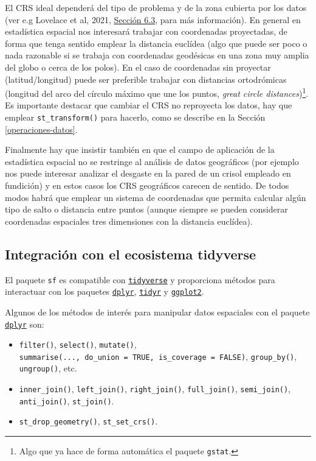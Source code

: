 \documentclass[
  spanish,
]{book}
\providecommand{\tightlist}{%
  \setlength{\itemsep}{0pt}\setlength{\parskip}{0pt}}
\theoremstyle{break}
\theoremstyle{definition}
\theoremstyle{definition}
\theoremstyle{definition}
\theoremstyle{definition}
\theoremstyle{remark}
\begin{document}
El CRS ideal dependerá del tipo de problema y de la zona cubierta por los datos (ver e.g Lovelace et al, 2021, \href{https://geocompr.robinlovelace.net/reproj-geo-data.html\#which-crs-to-use}{Sección 6.3}, para más información).
En general en estadística espacial nos interesará trabajar con coordenadas proyectadas, de forma que tenga sentido emplear la distancia euclídea (algo que puede ser poco o nada razonable si se trabaja con coordenadas geodésicas en una zona muy amplia del globo o cerca de los polos).
En el caso de coordenadas sin proyectar (latitud/longitud) puede ser preferible trabajar con distancias ortodrómicas (longitud del arco del círculo máximo que une los puntos, \emph{great circle distances})\footnote{Algo que ya hace de forma automática el paquete \texttt{gstat}.}.
Es importante destacar que cambiar el CRS no reproyecta los datos, hay que emplear \texttt{st\_transform()} para hacerlo, como se describe en la Sección \ref{operaciones-datos}.

Finalmente hay que insistir también en que el campo de aplicación de la estadística espacial no se restringe al análisis de datos geográficos (por ejemplo nos puede interesar analizar el desgaste en la pared de un crisol empleado en fundición) y en estos casos los CRS geográficos carecen de sentido.
De todos modos habrá que emplear un sistema de coordenadas que permita calcular algún tipo de salto o distancia entre puntos (aunque siempre se pueden considerar coordenadas espaciales tres dimensiones con la distancia euclídea).

\hypertarget{tidyverse-sf}{%
\subsection{\texorpdfstring{Integración con el ecosistema \textbf{tidyverse}}{Integración con el ecosistema tidyverse}}\label{tidyverse-sf}}

El paquete \texttt{sf} es compatible con \href{http://tidyverse.org}{\texttt{tidyverse}} y proporciona métodos para interactuar con los paquetes \href{https://dplyr.tidyverse.org}{\texttt{dplyr}},
\href{http://tidyr.tidyverse.org}{\texttt{tidyr}} y \href{https://ggplot2.tidyverse.org}{\texttt{ggplot2}}.

Algunos de los métodos de interés para manipular datos espaciales con el paquete \href{https://dplyr.tidyverse.org}{\texttt{dplyr}} son:

\begin{itemize}
\tightlist
\item
  \texttt{filter()}, \texttt{select()}, \texttt{mutate()}, \texttt{summarise(...,\ do\_union\ =\ TRUE,\ is\_coverage\ =\ FALSE)}, \texttt{group\_by()}, \texttt{ungroup()}, etc.
\item
  \texttt{inner\_join()}, \texttt{left\_join()}, \texttt{right\_join()}, \texttt{full\_join()}, \texttt{semi\_join()}, \texttt{anti\_join()}, \texttt{st\_join()}.
\item
  \texttt{st\_drop\_geometry()}, \texttt{st\_set\_crs()}.
\end{itemize}
\end{document}
